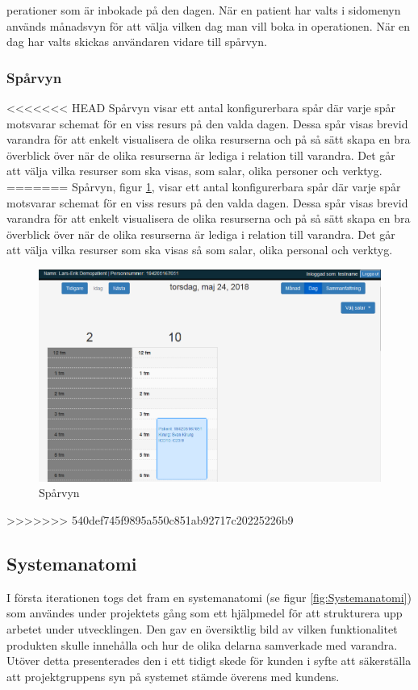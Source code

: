 perationer som är inbokade på den dagen. När en patient har valts i sidomenyn används månadsvyn för att välja vilken dag man vill boka in operationen. När en dag har valts skickas användaren vidare till spårvyn.

\subsubsection{Spårvyn}
<<<<<<< HEAD
Spårvyn visar ett antal konfigurerbara spår där varje spår motsvarar schemat för en viss resurs på den valda dagen. Dessa spår visas brevid varandra för att enkelt visualisera de olika resurserna och på så sätt skapa en bra överblick över när de olika resurserna är lediga i relation till varandra. Det går att välja vilka resurser som ska visas, som salar, olika personer och verktyg.
=======
Spårvyn, figur \ref{fig:track_view}, visar ett antal konfigurerbara spår där varje spår motsvarar schemat för en viss resurs på den valda dagen. Dessa spår visas brevid varandra för att enkelt visualisera de olika resurserna och på så sätt skapa en bra överblick över när de olika resurserna är lediga i relation till varandra. Det går att välja vilka resurser som ska visas så som salar, olika personal och verktyg.

\begin{figure}[H]
	\includegraphics[width=\linewidth]{Figures/track_view.png}
	\caption{Spårvyn}
	\label{fig:track_view}
\end{figure}

>>>>>>> 540def745f9895a550c851ab92717c20225226b9

\subsection{Systemanatomi}
I första iterationen togs det fram en systemanatomi (se figur \ref{fig:Systemanatomi}) som användes under projektets gång som ett hjälpmedel för att strukturera upp arbetet under utvecklingen. Den gav en översiktlig bild av vilken funktionalitet produkten skulle innehålla och hur de olika delarna samverkade med varandra. Utöver detta presenterades den i ett tidigt skede för kunden i syfte att säkerställa att projektgruppens syn på systemet stämde överens med kundens.

